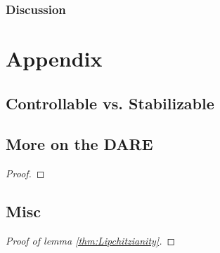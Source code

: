 \documentclass[12pt]{article}
\begin{document}
\subsubsection*{Discussion}



\newpage

\section{Appendix}
\printbibliography

\newpage

\subsection*{Controllable vs. Stabilizable}\label{sec:controllability-stabilizability}

\subsection*{More on the DARE}\label{sec:DARE}

\begin{lemma}

\end{lemma}

\begin{proof}

\end{proof}

\subsection*{Misc}

\begin{proof}[Proof of lemma \ref{thm:Lipchitzianity}]

\end{proof}
\end{document}
